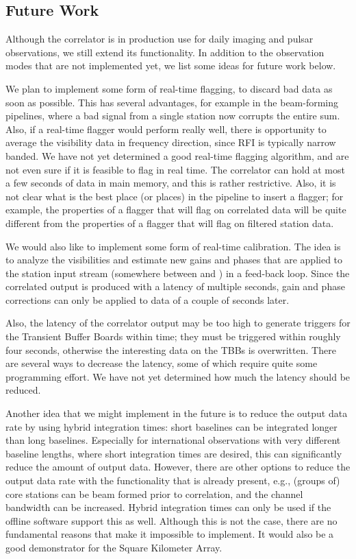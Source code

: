\subsection{Future Work}

Although the correlator is in production use for daily imaging and pulsar
observations, we still extend its functionality.
In addition to the observation modes that are not implemented yet, we list
some ideas for future work below.

We plan to implement some form of real-time flagging, to discard bad data
as soon as possible.
This has several advantages, for example in the beam-forming pipelines,
where a bad signal from a single station now corrupts the entire sum.
Also, if a real-time flagger would perform really well, there is opportunity
to average the visibility data in frequency direction, since RFI is typically
narrow banded.
We have not yet determined a good real-time flagging algorithm, and are not
even sure if it is feasible to flag in real time.
The correlator can hold at most a few seconds of data in main memory, and
this is rather restrictive.
Also, it is not clear what is the best place (or places) in the pipeline to
insert a flagger; for example, the properties of a flagger that will flag
on correlated data will be quite different from the properties of a flagger
that will flag on filtered station data.

We would also like to implement some form of real-time calibration.
The idea is to analyze the visibilities and estimate new gains and phases
that are applied to the station input stream (somewhere between
 and ) in a feed-back loop.
Since the correlated output is produced with a latency of multiple seconds,
gain and phase corrections can only be applied to data of a couple of seconds
later.

Also, the latency of the correlator output may be too high to generate
triggers for the Transient Buffer Boards within time; they must be triggered
within roughly four seconds, otherwise the interesting data on the TBBs is
overwritten.
There are several ways to decrease the latency, some of which require quite
some programming effort.
We have not yet determined how much the latency should be reduced.

Another idea that we might implement in the future is to reduce the output
data rate by using hybrid integration times: short baselines can be integrated
longer than long baselines.
Especially for international observations with very different baseline lengths,
where short integration times are desired, this can significantly reduce the
amount of output data.
However, there are other options to reduce the output data rate with the
functionality that is already present, e.g., (groups of) core stations can be 
beam formed prior to correlation, and the channel bandwidth can be increased.
Hybrid integration times can only be used if the offline software support
this as well.
Although this is not the case, there are no fundamental reasons that make it
impossible to implement.
It would also be a good demonstrator for the Square Kilometer Array.


